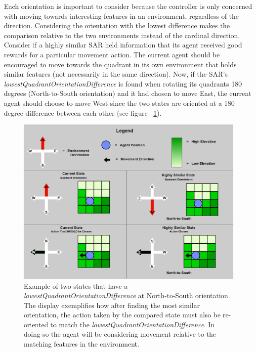 Each orientation is important to consider because the controller is only concerned with moving towards interesting features in an environment, regardless of the direction.
Considering the orientation with the lowest difference makes the comparison relative to the two environments instead of the cardinal direction.
Consider if a highly similar SAR held information that its agent received good rewards for a particular movement action.
The current agent should be encouraged to move towards the quadrant in its own environment that holds similar features (not necessarily in the same direction).
Now, if the SAR's \textit{lowestQuadrantOrientationDifference} is found when rotating its quadrants 180 degrees (North-to-South orientation) and it had chosen to move East, the current agent should choose to move West since the two states are oriented at a 180 degree difference between each other (see figure ~\ref{fig:oriented_movement_example}).

\begin{figure}[!htb]
  \centering
  \includegraphics[width=1.0\columnwidth]{Figures/oriented_movement_example.png}
  \caption[Orientation Comparison Example]{Example of two states that have a \textit{lowestQuadrantOrientationDifference} at North-to-South orientation. The display exemplifies how after finding the most similar orientation, the action taken by the compared state must also be re-oriented to match the \textit{lowestQuadrantOrientationDifference}. In doing so the agent will be considering movement relative to the matching features in the environment.}
  \label{fig:oriented_movement_example}
\end{figure}

